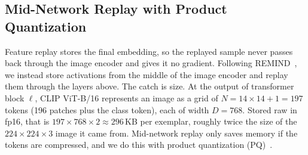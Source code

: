 
\subsection{Mid-Network Replay with Product Quantization}
\label{sec:remind}

Feature replay stores the final embedding, so the replayed sample never passes back through the image encoder and gives it no gradient. Following REMIND~\cite{hayes2020remind}, we instead store activations from the middle of the image encoder and replay them through the layers above. The catch is size. At the output of transformer block $\ell$, CLIP ViT-B/16 represents an image as a grid of $N = 14 \times 14 + 1 = 197$ tokens (196 patches plus the class token), each of width $D = 768$. Stored raw in fp16, that is $197 \times 768 \times 2 \approx 296$\,KB per exemplar, roughly twice the size of the $224 \times 224 \times 3$ image it came from. Mid-network replay only saves memory if the tokens are compressed, and we do this with product quantization (PQ)~\cite{jegou2011pq}.

